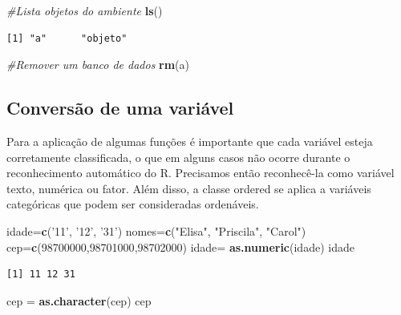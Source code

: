 \documentclass[12pt,brazil,]{book}
\newenvironment{Shaded}{\begin{snugshade}}{\end{snugshade}}
\newcommand{\CommentTok}[1]{\textcolor[rgb]{0.56,0.35,0.01}{\textit{#1}}}
\newcommand{\DecValTok}[1]{\textcolor[rgb]{0.00,0.00,0.81}{#1}}
\newcommand{\KeywordTok}[1]{\textcolor[rgb]{0.13,0.29,0.53}{\textbf{#1}}}
\newcommand{\NormalTok}[1]{#1}
\newcommand{\StringTok}[1]{\textcolor[rgb]{0.31,0.60,0.02}{#1}}
\begin{document}
\begin{Shaded}
\begin{Highlighting}[]
\CommentTok{#Lista objetos do ambiente}
\KeywordTok{ls}\NormalTok{()}
\end{Highlighting}
\end{Shaded}

\begin{verbatim}
[1] "a"      "objeto"
\end{verbatim}

\begin{Shaded}
\begin{Highlighting}[]
\CommentTok{#Remover um banco de dados}
\KeywordTok{rm}\NormalTok{(a)}
\end{Highlighting}
\end{Shaded}

\hypertarget{conversao-de-uma-variavel}{%
\subsection{Conversão de uma variável}\label{conversao-de-uma-variavel}}

Para a aplicação de algumas funções é importante que cada variável
esteja corretamente classificada, o que em alguns casos não ocorre
durante o reconhecimento automático do R. Precisamos então reconhecê-la
como variável texto, numérica ou fator. Além disso, a classe ordered se
aplica a variáveis categóricas que podem ser consideradas ordenáveis.

\begin{Shaded}
\begin{Highlighting}[]
\NormalTok{idade=}\KeywordTok{c}\NormalTok{(}\StringTok{'11'}\NormalTok{, }\StringTok{'12'}\NormalTok{, }\StringTok{'31'}\NormalTok{)}
\NormalTok{nomes=}\KeywordTok{c}\NormalTok{(}\StringTok{"Elisa"}\NormalTok{, }\StringTok{"Priscila"}\NormalTok{, }\StringTok{"Carol"}\NormalTok{)}
\NormalTok{cep=}\KeywordTok{c}\NormalTok{(}\DecValTok{98700000}\NormalTok{,}\DecValTok{98701000}\NormalTok{,}\DecValTok{98702000}\NormalTok{)}
\NormalTok{idade=}\StringTok{ }\KeywordTok{as.numeric}\NormalTok{(idade)}
\NormalTok{idade}
\end{Highlighting}
\end{Shaded}

\begin{verbatim}
[1] 11 12 31
\end{verbatim}

\begin{Shaded}
\begin{Highlighting}[]
\NormalTok{cep =}\StringTok{ }\KeywordTok{as.character}\NormalTok{(cep)}
\NormalTok{cep}
\end{Highlighting}
\end{Shaded}
\end{document}
